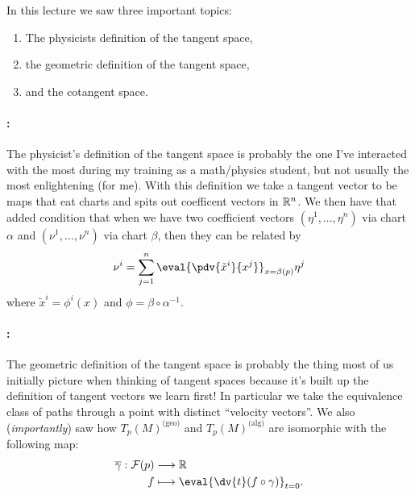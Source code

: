 \documentclass{homework}
\begin{document}
In this lecture we saw three important topics:
\begin{enumerate}
	\item The physicists definition of the tangent space,\label{it:phys}
	\item the geometric definition of the tangent space,\label{it:geo}
	\item and the cotangent space.\label{it:cotangent}
\end{enumerate}

\paragraph{:} The physicist's definition of the tangent space is probably the one I've interacted with the most during my training as a math/physics student, but not usually the most enlightening (for me).
With this definition we take a tangent vector to be maps that eat charts and spits out coefficent vectors in $\mathbb{R}^n$.
We then have that added condition that when we have two coefficient vectors $(\eta^1,\ldots, \eta^n)$ via chart $\alpha$ and $(\nu^1,\ldots,\nu^n)$ via chart $\beta$, then they can be related by
\begin{equation*}
	\nu^i = \sum_{j = 1}^n \eval{\pdv{\tilde{x}^i}{x^j}}_{x = \beta(p)}\eta^j
\end{equation*}
where $\tilde{x}^i = \phi^i(x)$ and $\phi = \beta\circ\alpha^{-1}$.

\paragraph{:} The geometric definition of the tangent space is probably the thing most of us initially picture when thinking of tangent spaces because it's built up the definition of tangent vectors we learn first!
In particular we take the equivalence class of paths through a point with distinct ``velocity vectors''.
We also (\emph{importantly}) saw how $T_p(M)^\text{(geo)}$ and $T_p(M)^\text{(alg)}$ are isomorphic with the following map:
\begin{align*}
	\overline{\gamma}: \mathcal{F}(p) & \longrightarrow \R                                \\
	f                                 & \longmapsto \eval{\dv{t}(f\circ \gamma)}_{t = 0}.
\end{align*}
\end{document}

